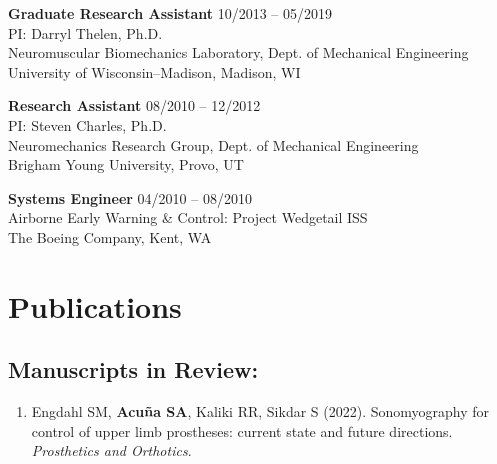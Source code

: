 \documentclass[letterpaper, 10pt]{article}
\begin{document}
\medskip

\textbf{Graduate Research Assistant} \hfill 10/2013 -- 05/2019
\\PI: Darryl Thelen, Ph.D.
\\Neuromuscular Biomechanics Laboratory, Dept. of Mechanical Engineering 
\\University of Wisconsin–Madison, Madison, WI

\medskip

\textbf{Research Assistant} \hfill 08/2010 -- 12/2012
\\PI: Steven Charles, Ph.D.
\\Neuromechanics Research Group, Dept. of Mechanical Engineering
\\Brigham Young University, Provo, UT

\medskip

\textbf{Systems Engineer} \hfill 04/2010 -- 08/2010
\\Airborne Early Warning \& Control: Project Wedgetail ISS 
\\The Boeing Company, Kent, WA

\section{Publications}

\subsection{Manuscripts in Review:}
\begin{enumerate}
    \item Engdahl SM, \textbf{Acuña SA}, Kaliki RR, Sikdar S (2022). Sonomyography for control of upper limb prostheses: current state and future directions. \textit{Prosthetics and Orthotics}.
\end{enumerate}
\end{document}
